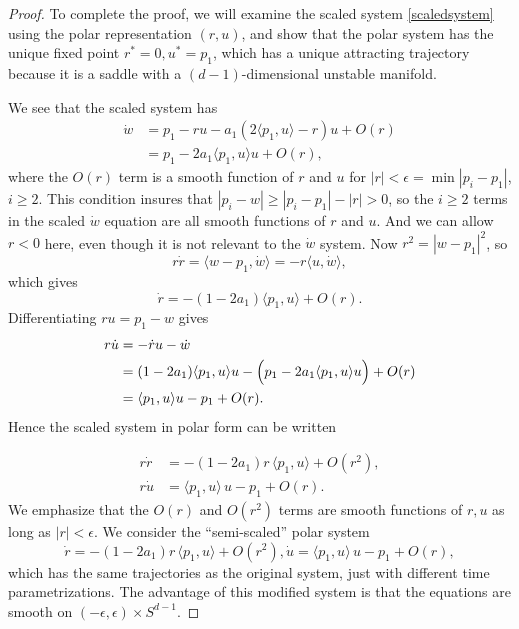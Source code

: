 \documentclass[%
 aip,
 amsmath,amssymb,
 reprint,%
]{revtex4-1}
\begin{document}
\begin{proof}
To complete the proof, we will examine the scaled system \eqref{scaledsystem} using the polar representation $(r, u)$, and show that the polar system has the unique fixed point $r^\ast = 0, u^\ast = p_1$, which has a unique attracting trajectory because it is a saddle with a $(d-1)$-dimensional unstable manifold.

We see that the scaled system has
\begin{align*}
\dot w &= p_1-ru  - a_1  \left ( 2\langle p_1, u \rangle - r \right) u +O(r)
\\&= p_1 - 2 a_1 \langle p_1, u \rangle u +O(r),
\end{align*}
where the $O(r)$ term is a smooth function of $r$ and $u$ for $|r|  < \epsilon = \min  |p_i-p_1|$, $i \ge 2$.  This condition insures that $|p_i - w| \ge |p_i - p_1| -|r| >0$, so the $i \ge 2$ terms in the scaled $\dot w$ equation are all smooth functions of $r$ and $u$.  And we can allow $r < 0$ here, even though it is not relevant to the $\dot w$ system.
Now $r^2 = |w-p_1|^2$, so
$$
r \dot r = \langle w-p_1, \dot w \rangle = -r \langle u, \dot w \rangle,
$$
which gives
$$
 \dot r  = -(1-2a_1) \langle p_1, u \rangle  +O(r).
$$
Differentiating $ru =  p_1 - w$ gives
\begin{align*}
r \dot u &=-\dot r u - \dot w \\ &= (1-2a_1) \langle p_1, u \rangle   u -  \Bigl ( p_1 - 2a_1\langle p_1, u \rangle u \Bigr ) + O(r) 
\\&= \langle p_1, u \rangle   u - p_1 +O(r).
\end{align*}
Hence the scaled system in polar form can be written

\begin{align*}
r \dot r &=  -(1-2a_1)   r  \,\langle p_1, u \rangle  +O(r^2), \\
r \dot u &=  \langle p_1, u \rangle \,  u -   p_1 +O(r).
\end{align*}
We emphasize that the $O(r)$ and $O(r^2)$ terms are smooth functions of $r, u$ as long as $|r| < \epsilon$.  We consider the ``semi-scaled'' polar system
\begin{subequations}
\begin{equation}
\dot r =  -(1-2a_1)   r  \,\langle p_1, u \rangle  +O(r^2),
\end{equation}
\begin{equation}
\dot u =  \langle p_1, u \rangle \,  u -   p_1 +O(r), 
\end{equation}
\label{semiscaled}
\end{subequations}
which has the same trajectories as the original system, just with different time parametrizations.  The advantage of this modified system is that the equations are smooth on $(-\epsilon, \epsilon) \times S^{d-1}$.  


\end{proof}
\end{document}
